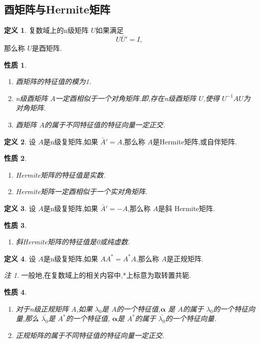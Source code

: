 \documentclass[a4paper,11pt]{article}%
\theoremstyle{remark}
\newtheorem*{remark}{注}
\theoremstyle{definition}
\theoremstyle{definition}
\newtheorem*{definition}{定义}
\theoremstyle{plain}
\newtheorem*{property}{性质}
\begin{document}
\subsection{酉矩阵与Hermite矩阵}
\begin{definition}
    复数域上的n级矩阵 $U$如果满足
    \[U\bar{U}'=I,\]
    那么称 $U$是酉矩阵.
\end{definition}
\begin{property}
    \begin{enumerate}
        \item 酉矩阵的特征值的模为1.
        \item n级酉矩阵 $A$一定酉相似于一个对角矩阵.即,存在n级酉矩阵 $U$,使得 $U^{-1}AU$为对角矩阵.
        \item 酉矩阵 $A$的属于不同特征值的特征向量一定正交.
    \end{enumerate}
\end{property}
\begin{definition}
    设 $A$是n级复矩阵,如果 $\bar{A}'=A$,那么称 $A$是Hermite矩阵,或自伴矩阵.
\end{definition}
\begin{property}
    \begin{enumerate}
        \item Hermite矩阵的特征值是实数.
        \item Hermite矩阵一定酉相似于一个实对角矩阵.
    \end{enumerate}
\end{property}

\begin{definition}
    设 $A$是n级复矩阵,如果 $\bar{A}'=-A$,那么称 $A$是斜 Hermite矩阵.
\end{definition}
\begin{property}
    \begin{enumerate}
        \item 斜Hermite矩阵的特征值是0或纯虚数.
    \end{enumerate}
\end{property}
\begin{definition}
    设 $A$是n级复矩阵,如果 $AA^*=A^*A$,那么称 $A$是正规矩阵.
\end{definition}
\begin{remark}
    一般地,在复数域上的相关内容中,*上标意为取转置共轭.
\end{remark}
\begin{property}
    \begin{enumerate}
        \item 对于n级正规矩阵 $A$,如果 $\lambda_0$是 $A$的一个特征值,$\bm{\alpha}$
        是 $A$的属于 $\lambda_0$的一个特征向量,那么 $\bar{\lambda_0}$是 $A^*$的一个特征值,
        $\bm{\alpha}$是 $A^*$的属于 $\bar{\lambda_0}$的一个特征向量.
        \item 正规矩阵的属于不同特征值的特征向量一定正交.
    \end{enumerate}
\end{property}
\end{document}
